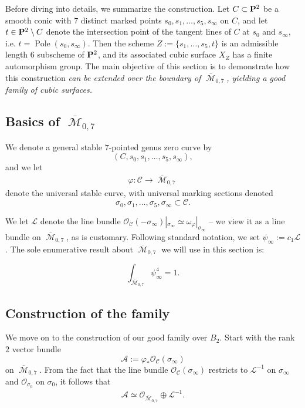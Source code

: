 \documentclass[12pt,reqno]{amsart}
\DeclareMathOperator{\Pole}{Pole}
\DeclareMathOperator{\M}{\mathcal{M}}
\renewcommand{\to}{{\longrightarrow}}
\numberwithin{equation}{section}
\renewcommand{\O}{\mathcal O}
\begin{document}
Before diving into details, we summarize the construction. Let
$C \subset \P^{2}$ be a smooth conic with $7$ distinct marked points
$s_{0}, s_{1}, \dots, s_{5}, s_{\infty}$ on $C$, and let
$t \in \P^{2} \setminus C$ denote the intersection point of the
tangent lines of $C$ at $s_{0}$ and $s_{\infty}$, i.e.
$t = \Pole(s_{0},s_{\infty})$.  Then the scheme
$Z := \{s_{1}, \dots , s_{5}, t \}$ is an admissible length $6$
subscheme of $\P^{2}$, and its associated cubic surface $X_{Z}$ has a
finite automorphism group.  The main objective of this section is to
demonstrate how this construction {\sl can be extended over the
  boundary of $\overline{\M}_{0,7}$, yielding a good family of cubic
  surfaces.}

\subsection{Basics of $\overline{\M}_{0,7}$}
\label{sec:basics-overlinem_0-7}

We denote a general stable $7$-pointed genus zero curve by
$$(C, s_{0}, s_{1}, \dots, s_{5}, s_{\infty}),$$
and we let 
\begin{align}
  \label{eq:PM07}
  \varphi: \mathcal{C} \to \overline{\M}_{0,7}
\end{align}
denote the universal stable curve, with universal marking sections
denoted $$\sigma_{0}, \sigma_{1}, \dots, \sigma_{5}, \sigma_{\infty} \subset \mathcal{C}.$$

We let $\mathcal{L}$ denote the line bundle
$\O_{\mathcal{C}}(-\sigma_{\infty})|_{\sigma_{\infty}} \simeq
\omega_{\varphi}|_{\sigma_{\infty}}$ -- we view it as a line bundle on
$\overline{\M}_{0,7}$, as is customary.  Following standard notation,
we set $\psi_{\infty} := c_{1}\mathcal{L}$.  The sole enumerative
result about $\overline{\M}_{0,7}$ we will use in this section is:

\begin{theorem}[ ???2 ]
  \label{theorem:psi}
  $$\int_{\overline{\M}_{0,7}} \psi_{\infty}^{4} = 1.$$
\end{theorem}

\subsection{Construction of the family}
\label{sec:construction-familyB2}


We move on to the construction of our good family over $B_2$. Start
with the rank $2$ vector bundle
$$\mathcal{A} := \varphi_{*}\O_{\mathcal{C}}(\sigma_{\infty})$$ on
$\overline{\M}_{0,7}$.  From the fact that the line bundle
$\O_{\mathcal{C}}(\sigma_{\infty})$ restricts to $\mathcal{L}^{-1}$ on
$\sigma_{\infty}$ and $\O_{\sigma_{0}}$ on $\sigma_{0}$, it follows
that
\begin{align*}
  \mathcal{A} \simeq \O_{\overline{\M}_{0,7}} \oplus \mathcal{L}^{-1}.
\end{align*}
\end{document}
